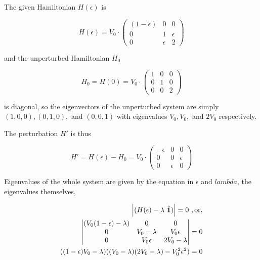 \question
{}

\begin{alphaparts}

\questionpart
The given Hamiltonian $H(\epsilon)$ is

\begin{equation}
    H(\epsilon) = V_0 \cdot 
    \begin{pmatrix}
        (1-\epsilon)    & 0         & 0         \\
        0               & 1         & \epsilon  \\
        0               & \epsilon  & 2         
    \end{pmatrix}
\end{equation}

and the unperturbed Hamiltonian $H_0$


\begin{equation}
    H_0 = H(0) = V_0 \cdot 
    \begin{pmatrix}
        1               & 0         & 0         \\
        0               & 1         & 0         \\
        0               & 0         & 2         
    \end{pmatrix}
\end{equation}

is diagonal, so the eigenvectors of the unperturbed system are simply $(1, 0,
0), (0, 1, 0), $ and $(0, 0, 1)$ with eigenvalues $V_0, V_0,$ and $2V_0$
respectively. 

The perturbation $H'$ is thus

\begin{equation}
    H' = H(\epsilon) - H_0 = V_0 \cdot 
    \begin{pmatrix}
        -\epsilon       & 0         & 0         \\
        0               & 0         & \epsilon  \\
        0               & \epsilon  & 0         
    \end{pmatrix}
\end{equation}

Eigenvalues of the whole system are given by the equation in $\epsilon$ and
$lambda$, the eigenvalues themselves,

\begin{align}
    \abs{(H(\epsilon) - \lambda ~\hat{\textbf{1}})} = 0~, \textnormal{or},\\ 
    \begin{vmatrix}
        (V_0(1-\epsilon)-\lambda) & 0         & 0         \\
        0                   & V_0-\lambda & V_0\epsilon  \\
        0                   & V_0\epsilon  & 2V_0-\lambda                 
    \end{vmatrix} = 0 \\
    ((1-\epsilon)V_0-\lambda)((V_0-\lambda)(2V_0-\lambda) - V_0^2\epsilon^2) = 0
\end{align}


\end{alphaparts}
